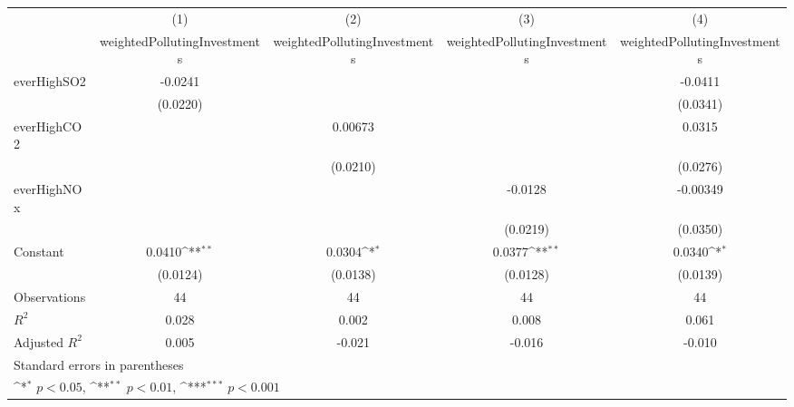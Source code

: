{
\def\sym#1{\ifmmode^{#1}\else\(^{#1}\)\fi}
\begin{tabular}{l*{4}{c}}
\toprule
                    &\multicolumn{1}{c}{(1)}&\multicolumn{1}{c}{(2)}&\multicolumn{1}{c}{(3)}&\multicolumn{1}{c}{(4)}\\
                    &\multicolumn{1}{c}{weightedPollutingInvestments}&\multicolumn{1}{c}{weightedPollutingInvestments}&\multicolumn{1}{c}{weightedPollutingInvestments}&\multicolumn{1}{c}{weightedPollutingInvestments}\\
\midrule
everHighSO2         &     -0.0241         &                     &                     &     -0.0411         \\
                    &    (0.0220)         &                     &                     &    (0.0341)         \\
\addlinespace
everHighCO2         &                     &     0.00673         &                     &      0.0315         \\
                    &                     &    (0.0210)         &                     &    (0.0276)         \\
\addlinespace
everHighNOx         &                     &                     &     -0.0128         &    -0.00349         \\
                    &                     &                     &    (0.0219)         &    (0.0350)         \\
\addlinespace
Constant            &      0.0410\sym{**} &      0.0304\sym{*}  &      0.0377\sym{**} &      0.0340\sym{*}  \\
                    &    (0.0124)         &    (0.0138)         &    (0.0128)         &    (0.0139)         \\
\midrule
Observations        &          44         &          44         &          44         &          44         \\
\(R^{2}\)           &       0.028         &       0.002         &       0.008         &       0.061         \\
Adjusted \(R^{2}\)  &       0.005         &      -0.021         &      -0.016         &      -0.010         \\
\bottomrule
\multicolumn{5}{l}{\footnotesize Standard errors in parentheses}\\
\multicolumn{5}{l}{\footnotesize \sym{*} \(p<0.05\), \sym{**} \(p<0.01\), \sym{***} \(p<0.001\)}\\
\end{tabular}
}
